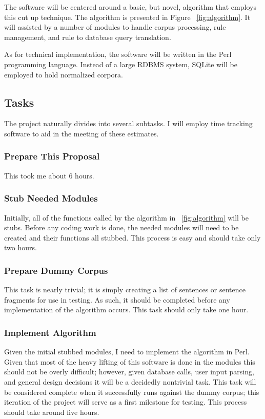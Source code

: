 \documentclass[10pt]{article}
\begin{document}
The software will be centered around a basic, but novel, algorithm that employs
this cut up technique. The algorithm is presented in Figure ~\ref{fig:algorithm}.
It will assisted by a number of modules to handle corpus processing, rule
management, and rule to database query translation. 

As for technical implementation, the software will be written in the Perl
programming language. Instead of a large RDBMS system, SQLite will be employed
to hold normalized corpora.

\subsection{Tasks}
The project naturally divides into several subtasks. I will employ time
tracking software to aid in the meeting of these estimates.

\subsubsection{Prepare This Proposal}
This took me about 6 hours.

\subsubsection{Stub Needed Modules}
Initially, all of the functions called by the algorithm in ~\ref{fig:algorithm}
will be stubs. Before any coding work is done, the needed modules will need to
be created and their functions all stubbed. This process is easy and should
take only two hours.

\subsubsection{Prepare Dummy Corpus}
This task is nearly trivial; it is simply creating a list of sentences or
sentence fragments for use in testing. As such, it should be completed before
any implementation of the algorithm occurs. This task should only take one hour.

\subsubsection{Implement Algorithm}
Given the initial stubbed modules, I need to implement the algorithm in Perl.
Given that most of the heavy lifting of this software is done in the modules
this should not be overly difficult; however, given database calls, user input
parsing, and general design decisions it will be a decidedly nontrivial task.
This task will be considered complete when it successfully runs against the dummy
corpus; this iteration of the project will serve as a first milestone for
testing. This process should take around five hours.
\end{document}
